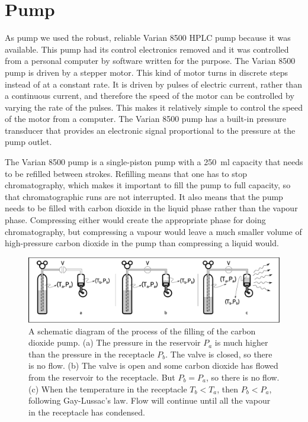 \section{Pump}
\label{sec:CO2Pump}

As pump we used the robust, reliable Varian 8500 HPLC pump because it was
available. This pump had its control electronics removed and it was controlled
from a personal computer by software written for the purpose. The Varian 8500
pump is driven by a stepper motor. This kind of motor turns in discrete steps
instead of at a constant rate. It is driven by pulses of electric current,
rather than a continuous current, and therefore the speed of the motor can be
controlled by varying the rate of the pulses. This makes it relatively simple to
control the speed of the motor from a computer. The Varian 8500 pump has a
built-in pressure transducer that provides an electronic signal proportional to
the pressure at the pump outlet.

The Varian 8500 pump is a single-piston pump with a \SI{250}{\milli\litre}
capacity that needs to be refilled between strokes. Refilling means that one has
to stop chromatography, which makes it important to fill the pump to full
capacity, so that chromatographic runs are not interrupted. It also means that the
pump needs to be filled with carbon dioxide in the liquid phase rather than the
vapour phase. Compressing either would create the appropriate phase for doing
chromatography, but compressing a vapour would leave a much smaller volume of
high-pressure carbon dioxide in the pump than compressing a liquid would.
 
\begin{figure}
\centering
\includegraphics[width=\textwidth]{Figures/CO2Filling.pdf}
\decoRule

\caption[Filling a CO\textsubscript{2} pump.]{A schematic diagram of the process
of the filling of the carbon dioxide pump. (a) The pressure in the reservoir
\(P_a\) is much higher than the pressure in the receptacle \(P_b\). The valve is
closed, so there is no flow. (b) The valve is open and some carbon dioxide has
flowed from the reservoir to the receptacle. But \(P_b = P_a\), so there is no
flow. (c) When the temperature in the receptacle \(T_b < T_a\), then \(P_b  < P_a\),
following Gay-Lussac's law. Flow will continue until all the vapour in the
receptacle has condensed.}

\label{fig:co2fill}
\end{figure}


